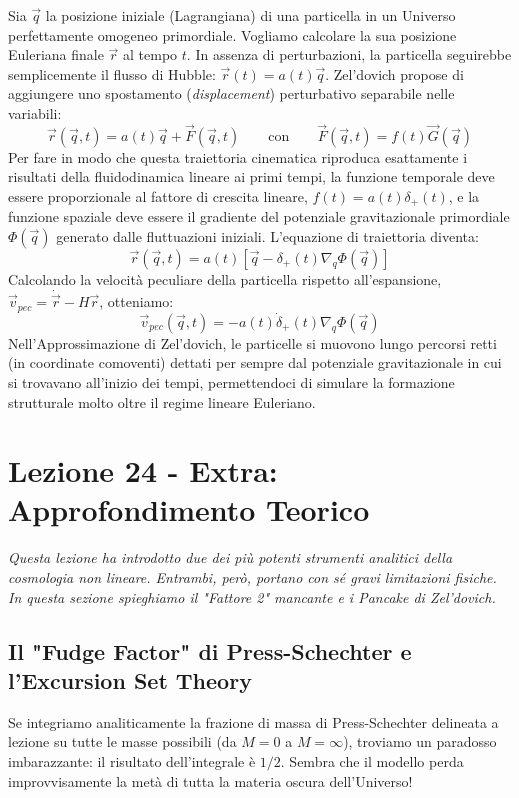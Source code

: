 \documentclass[11pt,a4paper]{report}
\begin{document}
Sia $\vec{q}$ la posizione iniziale (Lagrangiana) di una particella in un Universo perfettamente omogeneo primordiale. Vogliamo calcolare la sua posizione Euleriana finale $\vec{r}$ al tempo $t$. 
In assenza di perturbazioni, la particella seguirebbe semplicemente il flusso di Hubble: $\vec{r}(t) = a(t)\vec{q}$. 
Zel'dovich propose di aggiungere uno spostamento (\textit{displacement}) perturbativo separabile nelle variabili:
\begin{equation}
\vec{r}(\vec{q}, t) = a(t) \vec{q} + \vec{F}(\vec{q}, t) \qquad \text{con} \qquad \vec{F}(\vec{q}, t) = f(t) \vec{G}(\vec{q})
\end{equation}
Per fare in modo che questa traiettoria cinematica riproduca esattamente i risultati della fluidodinamica lineare ai primi tempi, la funzione temporale deve essere proporzionale al fattore di crescita lineare, $f(t) = a(t)\delta_+(t)$, e la funzione spaziale deve essere il gradiente del potenziale gravitazionale primordiale $\Phi(\vec{q})$ generato dalle fluttuazioni iniziali. L'equazione di traiettoria diventa:
\begin{equation}
\vec{r}(\vec{q}, t) = a(t) \left[ \vec{q} - \delta_+(t) \nabla_q \Phi(\vec{q}) \right]
\end{equation}
Calcolando la velocità peculiare della particella rispetto all'espansione, $\vec{v}_{pec} = \dot{\vec{r}} - H\vec{r}$, otteniamo:
\begin{equation}
\vec{v}_{pec}(\vec{q}, t) = -a(t) \dot{\delta}_+(t) \nabla_q \Phi(\vec{q})
\end{equation}
Nell'Approssimazione di Zel'dovich, le particelle si muovono lungo percorsi retti (in coordinate comoventi) dettati per sempre dal potenziale gravitazionale in cui si trovavano all'inizio dei tempi, permettendoci di simulare la formazione strutturale molto oltre il regime lineare Euleriano.

\newpage
\section{Lezione 24 - Extra: Approfondimento Teorico}

\textit{Questa lezione ha introdotto due dei più potenti strumenti analitici della cosmologia non lineare. Entrambi, però, portano con sé gravi limitazioni fisiche. In questa sezione spieghiamo il "Fattore 2" mancante e i Pancake di Zel'dovich.}

\subsection{Il "Fudge Factor" di Press-Schechter e l'Excursion Set Theory}
Se integriamo analiticamente la frazione di massa di Press-Schechter delineata a lezione su tutte le masse possibili (da $M=0$ a $M=\infty$), troviamo un paradosso imbarazzante: il risultato dell'integrale è $1/2$. Sembra che il modello perda improvvisamente la metà di tutta la materia oscura dell'Universo!
\end{document}
